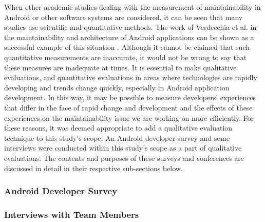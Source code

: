 When other academic studies dealing with the measurement of maintainability in Android or other software systems are considered, it can be seen that many studies use scientific and quantitative methods. The work of Verdecchia et al. in the maintainability and architecture of Android applications can be shown as a successful example of this situation \cite{14}. Although it cannot be claimed that such quantitative measurements are inaccurate, it would not be wrong to say that these measures are inadequate at times. It is essential to make qualitative evaluations, and quantitative evaluations in areas where technologies are rapidly developing and trends change quickly, especially in Android application development. In this way, it may be possible to measure developers' experiences that differ in the face of rapid change and development and the effects of these experiences on the maintainability issue we are working on more efficiently. For these reasons, it was deemed appropriate to add a qualitative evaluation technique to this study’s scope. An Android developer survey and some interviews were conducted within this study's scope as a part of qualitative evaluations. The contents and purposes of these surveys and conferences are discussed in detail in their respective sub-sections below.

\subsubsection{Android Developer Survey}


\subsubsection{Interviews with Team Members}

